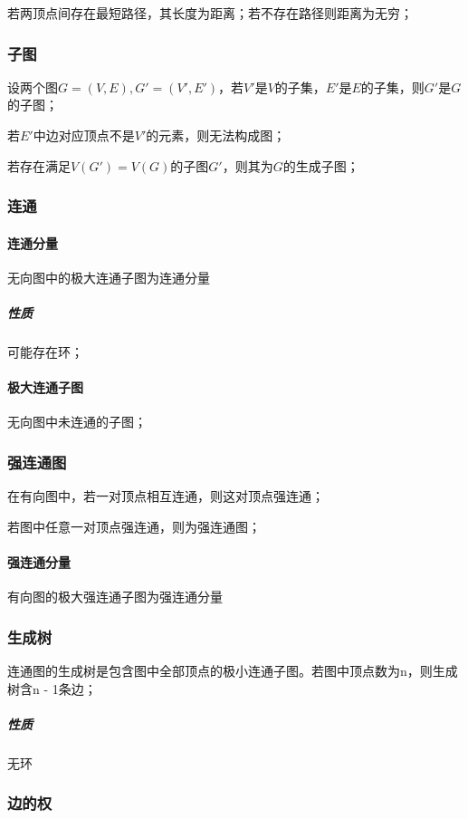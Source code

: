 若两顶点间存在最短路径，其长度为距离；若不存在路径则距离为无穷；


\subsubsection{子图}
设两个图\(G = (V, E), G' = (V', E')\)，若\(V'\)是\(V\)的子集，\(E'\)是\(E\)的子集，则\(G'\)是\(G\)的子图；

若\(E'\)中边对应顶点不是\(V'\)的元素，则无法构成图；

若存在满足\(V(G') = V(G)\)的子图\(G'\)，则其为\(G\)的生成子图；


\subsubsection{连通}

\paragraph{连通分量}
无向图中的极大连通子图为连通分量

\subparagraph{性质}
可能存在环；

\paragraph{极大连通子图}
无向图中未连通的子图；


\subsubsection{强连通图}

在有向图中，若一对顶点相互连通，则这对顶点强连通；

若图中任意一对顶点强连通，则为强连通图；

\paragraph{强连通分量}
有向图的极大强连通子图为强连通分量


\subsubsection{生成树}
连通图的生成树是包含图中全部顶点的极小连通子图。若图中顶点数为n，则生成树含n - 1条边；
\subparagraph{性质}
无环


\subsubsection{边的权}


